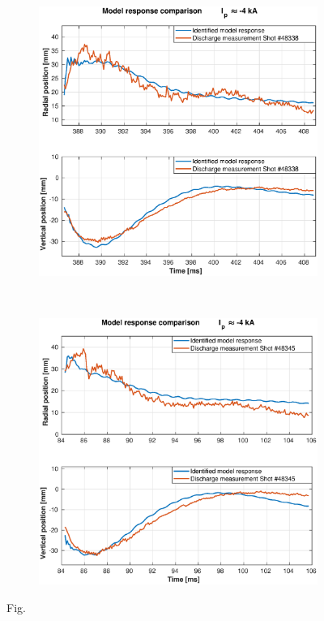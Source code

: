 \begin{figure}
	 \begin{subfigure}[b]{0.55\textwidth}
		\includegraphics[width=\textwidth]{Chp5/SimResp_338.eps}  
		\caption{\label{cvcv} }
	\end{subfigure}
	~ %
	\begin{subfigure}[b]{0.55\textwidth}
		\includegraphics[width=\textwidth]{Chp5/SimResp_345.eps}        
		\caption{\label{vcvc}}
		   \end{subfigure}
	   \caption{Fig. }
\end{figure}


